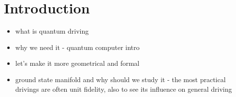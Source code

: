 \chapter*{Introduction}

\begin{itemize}
    \item what is quantum driving
    \item why we need it - quantum computer intro
    \item let's make it more geometrical and formal
    \item ground state manifold and why should we study it - the most practical drivings are often unit fidelity, also to see its influence on general driving
\end{itemize}
